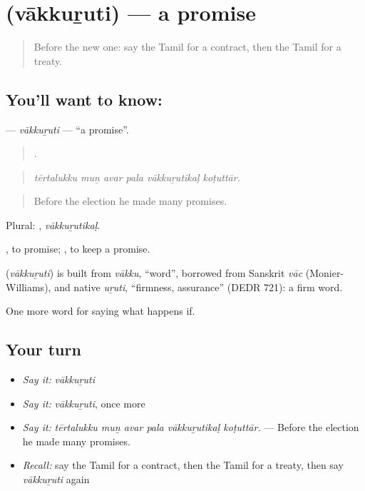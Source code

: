\section[\texorpdfstring{\ta{வாக்குறுதி} (vākkuṟuti)}{வாக்குறுதி (vākkuṟuti)}]{ (vākkuṟuti) — a promise}

\label{lesson:TA-C387-vakkuruti}



\begin{quote}
Before the new one: say the Tamil for a contract, then the Tamil for a treaty.
\end{quote}

\subsection*{You'll want to know: }
\textbf{} — \emph{vākkuṟuti} — \textquotedblleft{}a promise\textquotedblright{}.

\begin{quote}
     .
\end{quote}

\begin{quote}
\emph{tērtalukku muṉ avar pala vākkuṟutikaḷ koṭuttār.}
\end{quote}

\begin{quote}
Before the election he made many promises.
\end{quote}

Plural: , \emph{vākkuṟutikaḷ}.

 , to promise;  , to keep a promise.

\begin{cousinweb}
\textbf{} (\emph{vākkuṟuti}) is built from \emph{vākku}, \textquotedblleft{}word\textquotedblright{}, borrowed from Sanskrit \emph{vāc} (Monier-Williams), and native \emph{uṟuti}, \textquotedblleft{}firmness, assurance\textquotedblright{} (DEDR 721): a firm word.
\end{cousinweb}

\begin{grammarlens}[title={What you've built}]
One more word for saying what happens if.
\end{grammarlens}

\subsection*{Your turn}
\begin{itemize}
\raggedright
  \item \emph{Say it:} \emph{vākkuṟuti}
  \item \emph{Say it:} \emph{vākkuṟuti}, once more
  \item \emph{Say it:} \emph{tērtalukku muṉ avar pala vākkuṟutikaḷ koṭuttār.} — Before the election he made many promises.
  \item \emph{Recall:} say the Tamil for a contract, then the Tamil for a treaty, then say \emph{vākkuṟuti} again
\end{itemize}

